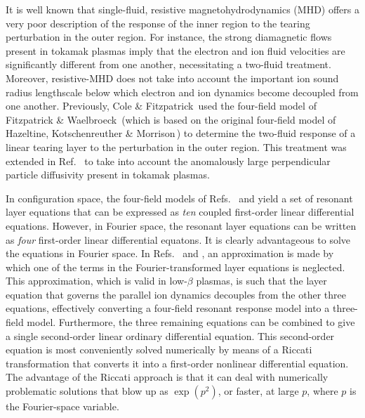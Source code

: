 \documentclass[12pt,prb,aps]{revtex4-1}
\begin{document}
It is well known that single-fluid, resistive magnetohydrodynamics (MHD) offers a very poor description of
the response of the inner region to the tearing perturbation in the outer region. 
For instance, the strong  diamagnetic flows present in tokamak plasmas imply that the  electron and ion fluid velocities are significantly different from one another,
necessitating a two-fluid treatment.\cite{ara} Moreover, resistive-MHD does not take  into account the important  ion sound radius lengthscale below which electron and ion dynamics become decoupled from one another.\cite{drake,wal} Previously, Cole \& Fitzpatrick\,\cite{cole} used the four-field model
of Fitzpatrick \& Waelbroeck\,\cite{fw} (which is based on the original four-field model of Hazeltine, Kotschenreuther \& Morrison\,\cite{haz}) 
to determine the two-fluid response of a linear tearing layer to the perturbation in the outer region. This treatment was extended in Ref.~ to take into account the
 anomalously large perpendicular  particle diffusivity  present in tokamak plasmas. 
 
 In configuration space, the four-field models of Refs.~ and  yield a set of resonant layer equations that can be expressed as 
 {\em ten}\/ coupled
 first-order linear differential equations.\cite{lee} However, in Fourier space, the resonant layer equations can be written as 
 {\em four}\/ first-order linear differential equatons.\cite{cole} It is clearly advantageous to solve the equations in Fourier space. In Refs.~
 and , an approximation is made by which one of the terms in the Fourier-transformed layer equations is neglected. This
 approximation, which is valid in low-$\beta$ plasmas,  is such that the layer equation that governs the parallel ion dynamics decouples from the other three equations, effectively
 converting a four-field resonant response model into a three-field model. Furthermore, the three remaining equations can be combined to give a
 single second-order linear ordinary differential equation. This second-order equation is most conveniently solved numerically by means of a Riccati transformation
 that converts it into a first-order nonlinear differential equation.\cite{ric1,ric2} The advantage of the Riccati approach is that it can deal with numerically problematic  solutions
 that blow up as $\exp(p^2)$, or faster, at large $p$, where $p$ is the Fourier-space variable. 
 
\end{document}
